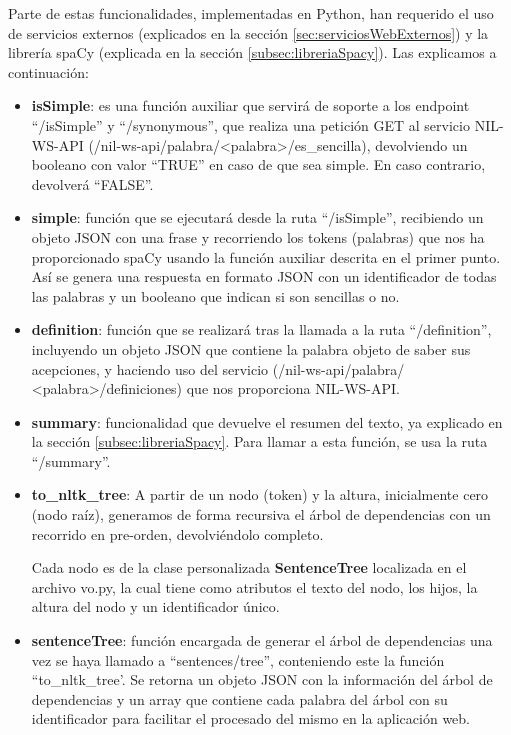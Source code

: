 Parte de estas funcionalidades, implementadas en Python, han requerido el uso de servicios externos (explicados en la sección \ref{sec:serviciosWebExternos}) y la librería spaCy (explicada en la sección \ref{subsec:libreriaSpacy}). Las explicamos a continuación:

\begin{itemize}
	\item \textbf{isSimple}: es una función auxiliar que servirá de soporte a los endpoint ``/isSimple'' y ``/synonymous'', que realiza una petición GET al servicio NIL-WS-API (/nil-ws-api/palabra/<palabra>/es\_sencilla), devolviendo un booleano con valor ``TRUE'' en caso de que sea simple. En caso contrario, devolverá ``FALSE''.
	
	\item \textbf{simple}: función que se ejecutará desde la ruta ``/isSimple'', recibiendo un objeto JSON con una frase y recorriendo los tokens (palabras) que nos ha proporcionado spaCy usando la función auxiliar descrita en el primer punto. Así se genera una respuesta en formato JSON con un identificador de todas las palabras y un booleano que indican si son sencillas o no.
	
	\item \textbf{definition}: función que se realizará tras la llamada a la ruta ``/definition'', incluyendo un objeto JSON que contiene la palabra objeto de saber sus acepciones, y haciendo uso del servicio (/nil-ws-api/palabra/ <palabra>/definiciones) que nos proporciona NIL-WS-API.
	
	\item \textbf{summary}: funcionalidad que devuelve el resumen del texto, ya explicado en la sección \ref{subsec:libreriaSpacy}. Para llamar a esta función, se usa la ruta ``/summary''. 
	
	\item \textbf{to\_nltk\_tree}: A partir de un nodo (token) y la altura, inicialmente cero (nodo raíz), generamos de forma recursiva el árbol de dependencias con un recorrido en pre-orden, devolviéndolo completo.
	
	Cada nodo es de la clase personalizada \textbf{SentenceTree} localizada en el archivo vo.py, la cual tiene como atributos el texto del nodo, los hijos, la altura del nodo y un identificador único.
	
	\item \textbf{sentenceTree}: función encargada de generar el árbol de dependencias una vez se haya llamado a ``sentences/tree'', conteniendo este la función ``to\_nltk\_tree'. Se retorna un objeto JSON con la información del árbol de dependencias y un array que contiene cada palabra del árbol con su identificador para facilitar el procesado del mismo en la aplicación web.
	

\end{itemize}
